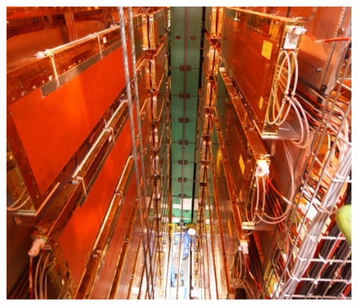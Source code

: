 \begin{frame}
     \begin{figure}[h]
        \centering
        \includegraphics[height=\textheight]{Figures Introductory Lecture/LHCb Detector/LHCb_Muon.jpg}%
        \end{figure}
\end{frame}
